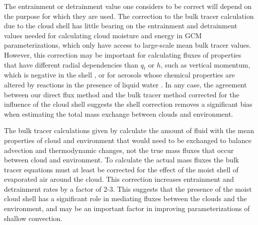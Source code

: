 \documentclass[draft,grl]{agutex}
\begin{document}
\begin{article}
The entrainment or detrainment value one considers to be correct will depend on 
the purpose for which they are used.  The correction to the bulk tracer 
calculation due to the cloud shell has little bearing on the entrainment and 
detrainment values needed for calculating cloud moisture and energy in GCM 
parameterizations, which only have access to large-scale mean bulk tracer 
values.  However, this correction may be important for calculating 
fluxes of properties that have different radial dependencies than $q_t$ or $h$, 
such as vertical momentum, which is negative in the shell \citep{Heus2008}, or 
for aerosols whose chemical properties are altered by reactions in the presence 
of liquid water \citep{Hoppel1994}.  In any case, the agreement between our 
direct flux method and the bulk tracer method corrected for the influence of 
the cloud shell suggests the shell correction removes a significant bias when 
estimating the total mass exchange between clouds and environment.

The bulk tracer calculations given by \cite{Siebesma1995} calculate the amount
of fluid with the mean properties of cloud and environment that would need to
be exchanged to balance advection and thermodynamic changes, not the true mass
fluxes that occur between cloud and environment.  To calculate the actual mass
fluxes the bulk tracer equations must at least be corrected for the effect of
the moist shell of evaporated air around the cloud.  This correction increases
entrainment and detrainment rates by a factor of 2-3.  This suggests that the
presence of the moist cloud shell has a significant role in mediating fluxes
between the clouds and the environment, and may be an important factor in 
improving parameterizations of shallow convection.




\end{article}
\end{document}
